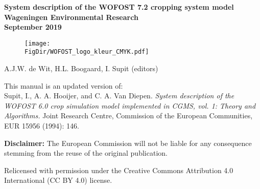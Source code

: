 \documentclass[a4paper,12pt,oneside]{book}
\newcommand{\FigDir}{D:/UserData/sources/WOFOST_system_docs/latex/figs}
\begin{document}

\frontmatter
\begin{titlepage}
	\centering
	\vfill
	{\bfseries
		{\LARGE
		System description of the WOFOST 7.2 cropping system model}\\
		\vskip0.5cm
		{\large
			Wageningen Environmental Research\\ 
   	        \vskip0.5cm
			September 2019}\\

		\begin{figure}[h]
		\texttt{[image: \\FigDir/WOFOST\_logo\_kleur\_CMYK.pdf]}
	    \end{figure}
		\vskip1cm

		{\large A.J.W. de Wit, H.L. Boogaard, I. Supit (editors)}\\
		\vskip0.5cm
     }
     {\small 

	This manual is an updated version of:\\
    Supit, I., A. A. Hooijer, and C. A. Van Diepen. 
	\textit{System description of the WOFOST 6.0 crop simulation model implemented in CGMS, vol. 1: 
    Theory and Algorithms.} Joint Research Centre, Commission of the European Communities, EUR 15956 
             (1994): 146.
             
    \textbf{Disclaimer:} The European Commission will not be liable for any consequence stemming from the reuse of the
     original publication.
     
    Relicensed with permission under the Creative Commons Attribution 4.0 International (CC BY 4.0) license.
    }
\end{titlepage}
\tableofcontents
\listoffigures
\listoftables
\cleardoublepage

\mainmatter







\backmatter
\appendix



\end{document}
